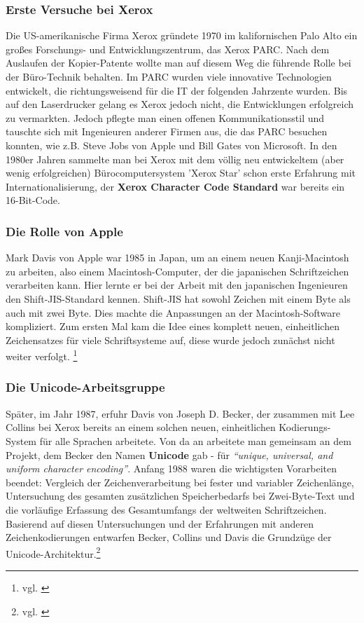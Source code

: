 \subsubsection{Erste Versuche bei Xerox}
Die US-amerikanische Firma Xerox gründete 1970 im kalifornischen Palo Alto ein großes Forschungs- und Entwicklungszentrum, das Xerox PARC. Nach dem Auslaufen der Kopier-Patente wollte man auf diesem Weg die führende Rolle bei der Büro-Technik behalten. Im PARC wurden viele innovative Technologien entwickelt, die richtungsweisend für die IT der folgenden Jahrzente wurden. Bis auf den Laserdrucker gelang es Xerox jedoch nicht, die Entwicklungen erfolgreich zu vermarkten. Jedoch pflegte man einen offenen Kommunikationsstil und tauschte sich mit Ingenieuren anderer Firmen aus, die das PARC besuchen konnten, wie z.B. Steve Jobs von Apple und Bill Gates von Microsoft.  
In den 1980er Jahren sammelte man bei Xerox mit dem völlig neu entwickeltem (aber wenig erfolgreichen) Bürocomputersystem 'Xerox Star' schon erste Erfahrung mit Internationalisierung, der \textbf{Xerox Character Code Standard} war bereits ein 16-Bit-Code.

\subsubsection{Die Rolle von Apple}
Mark Davis von Apple war 1985 in Japan, um an einem neuen Kanji-Macintosh zu arbeiten, also einem Macintosh-Computer, der die japanischen Schriftzeichen verarbeiten kann. Hier lernte er bei der Arbeit mit den japanischen Ingenieuren den Shift-JIS-Standard kennen.
Shift-JIS hat sowohl Zeichen mit einem Byte als auch mit zwei Byte. Dies machte die Anpassungen an der Macintosh-Software kompliziert. Zum ersten Mal kam die Idee eines komplett neuen, einheitlichen Zeichensatzes für viele Schriftsysteme auf, diese wurde jedoch zunächst nicht weiter verfolgt. 
\footnote{vgl. \cite{UCC}}

\subsubsection{Die Unicode-Arbeitsgruppe}
Später, im Jahr 1987, erfuhr Davis von Joseph D. Becker, der zusammen mit Lee Collins bei Xerox bereits an einem solchen neuen, einheitlichen Kodierungs-System für alle Sprachen arbeitete.
Von da an arbeitete man gemeinsam an dem Projekt, dem Becker den Namen \textbf{Unicode} gab - für \textit{“unique, universal, and uniform character encoding”}.
Anfang 1988 waren die wichtigsten Vorarbeiten beendet: Vergleich der Zeichenverarbeitung bei fester und variabler Zeichenlänge, Untersuchung des gesamten zusätzlichen Speicherbedarfs bei Zwei-Byte-Text und die vorläufige Erfassung des Gesamtumfangs der weltweiten Schriftzeichen. Basierend auf diesen Untersuchungen und der Erfahrungen mit anderen Zeichenkodierungen entwarfen Becker, Collins und Davis die Grundzüge der Unicode-Architektur.\footnote{vgl. \cite{UCC}}

